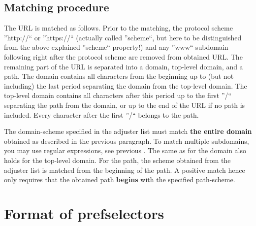 \documentclass[
a4paper,
12pt,
]
{article}
\begin{document}
 \subsection{Matching procedure}
 The URL is matched as follows. Prior to the matching, the protocol scheme ''http://`` or ''https://`` (actually called ''scheme``, but here to be distinguished from the above explained ''scheme`` property!) and any ''www`` subdomain following right after the protocol scheme are removed from obtained URL. The remaining part of the URL is separated into a domain, top-level domain, and a path. The domain contains all characters from the beginning up to (but not including) the last period separating the domain from the top-level domain. 
 The top-level domain contains all characters after this period up to the first ''/`` separating the path from the domain, or up to the end of the URL if no path is included. Every character after the first ''/`` belongs to the path.\par
 
 The domain-scheme specified in the adjuster list must match \textbf{the entire domain} obtained as described in the previous paragraph. To match multiple subdomains, you may use regular expressions, see previous . The same as for the domain also holds for the top-level domain. For the path, the scheme obtained from the adjuster list is matched from the beginning of the path. A positive match hence only requires that the obtained path \textbf{begins} with the specified path-scheme. 
 
 \section{Format of prefselectors}\label{app_prefselector}
\end{document}
